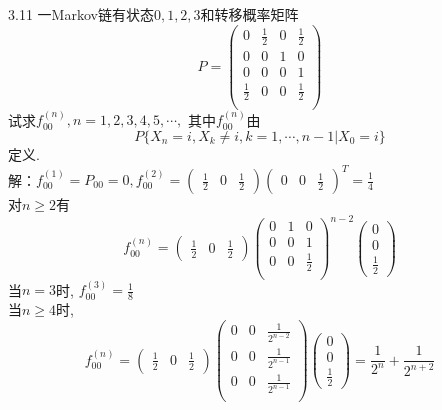 3.11 一Markov链有状态$0,1,2,3$和转移概率矩阵
\[
P = 
\begin{pmatrix}
0 & \frac{1}{2} & 0 & \frac{1}{2}\\
0 & 0 & 1 & 0\\
0 & 0 & 0 & 1\\
\frac{1}{2} & 0 & 0 & \frac{1}{2}\\
\end{pmatrix}
\]
试求$f^{(n)}_{00}, n = 1,2,3,4,5,\cdots, $ 其中$f^{(n)}_{00}$由
\[
P\{X_n = i, X_k \neq i, k = 1, \cdots, n-1 | X_0 = i\}
\]
定义.\\
解：$f^{(1)}_{00} = P_{00} = 0, f^{(2)}_{00} = \begin{pmatrix}\frac{1}{2} & 0 & \frac{1}{2}\end{pmatrix}\begin{pmatrix}0 & 0 & \frac{1}{2}\end{pmatrix}^T = \frac{1}{4} $\\
对$n \geqslant 2$有
\[
f^{(n)}_{00} = \begin{pmatrix}\frac{1}{2} & 0 & \frac{1}{2}\end{pmatrix}
	\begin{pmatrix}
	0 & 1 & 0 \\
	0 & 0 & 1 \\
	0 & 0 & \frac{1}{2}\\
	\end{pmatrix}^{n-2}
	\begin{pmatrix}0 \\ 0 \\ \frac{1}{2}\end{pmatrix}
\]
当$n=3$时, $f^{(3)}_{00} = \frac{1}{8}$\\
当$n \geqslant 4$时, 
\[
f^{(n)}_{00} = \begin{pmatrix}\frac{1}{2} & 0 & \frac{1}{2}\end{pmatrix}
	\begin{pmatrix}
	0 & 0 & \frac{1}{2^{n-2}}\\
	0 & 0 & \frac{1}{2^{n-1}}\\
	0 & 0 & \frac{1}{2^{n-1}}\\
	\end{pmatrix}
	\begin{pmatrix}0 \\ 0 \\ \frac{1}{2}\end{pmatrix}
	= \frac{1}{2^n} + \frac{1}{2^{n+2}}
\]


